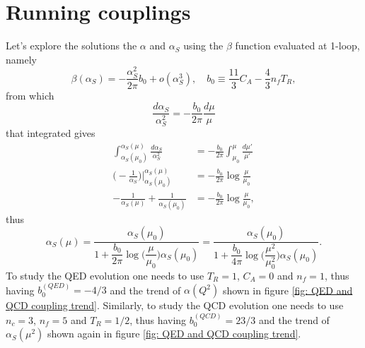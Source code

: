 \section{Running couplings}
Let's explore the solutions the $\alpha$ and $\alpha_S$ using the $\beta$ function evaluated at 1-loop, namely
\begin{equation}
    \beta(\alpha_S) = -\frac{\alpha_S^2}{2\pi}b_0 + o(\alpha_S^3),\quad b_0 \equiv \frac{11}{3}C_A - \frac{4}{3}n_fT_R,
\end{equation}
from which
\begin{equation}
    \frac{d\alpha_S}{\alpha_S^2} = -\frac{b_0}{2\pi}\frac{d\mu}{\mu}
\end{equation}
that integrated gives
\begin{equation}
    \begin{split}
        \int_{\alpha_S(\mu_0)}^{\alpha_S(\mu)}\frac{d\alpha_S}{\alpha_S^2} &= -\frac{b_0}{2\pi}\int_{\mu_0}^{\mu}\frac{d\mu'}{\mu'} \\
        \bigg(-\frac{1}{\alpha_S}\bigg)\bigg|_{\alpha_S(\mu_0)}^{\alpha_S(\mu)}&= -\frac{b_0}{2\pi}\log{\frac{\mu}{\mu_0}} \\
        -\frac{1}{\alpha_S(\mu)} + \frac{1}{\alpha_S(\mu_0)} &= -\frac{b_0}{2\pi}\log{\frac{\mu}{\mu_0}}, 
    \end{split}
\end{equation}
thus 
\begin{equation}
    \alpha_S(\mu) = \frac{\alpha_S(\mu_0)}{1 + \dfrac{b_0}{2\pi}\log{\bigg(\dfrac{\mu}{\mu_0}\bigg)}\alpha_S(\mu_0)} = \frac{\alpha_S(\mu_0)}{1 + \dfrac{b_0}{4\pi}\log{\bigg(\dfrac{\mu^2}{\mu_0^2}\bigg)}\alpha_S(\mu_0)}.
\end{equation}
To study the QED evolution one needs to use $T_R = 1$, $C_A = 0$ and $n_f = 1$, thus having $b_0^{(QED)} = -4/3$ and the trend of $\alpha(Q^2)$ shown in figure \ref{fig: QED and QCD coupling trend}. Similarly, to study the QCD evolution one needs to use $n_c = 3$, $n_f = 5$ and $T_R = 1/2$, thus having $b_0^{(QCD)} = 23/3$ and the trend of $\alpha_S(\mu^2)$ shown again in figure \ref{fig: QED and QCD coupling trend}.
